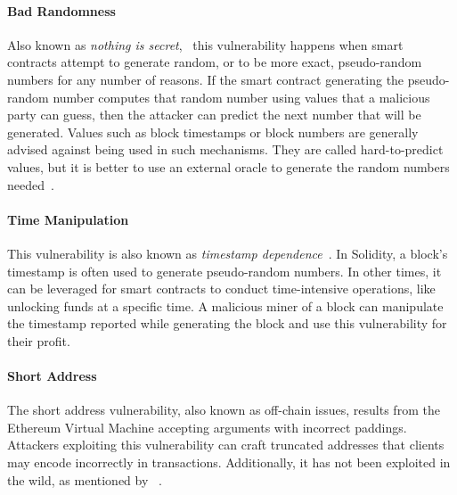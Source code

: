             \paragraph{Bad Randomness}
            Also known as \textit{nothing is secret},~\cite{dasp} this vulnerability happens when smart contracts attempt to generate random, or to be more exact, pseudo-random numbers for any number of reasons.
            If the smart contract generating the pseudo-random number computes that random number using values that a malicious party can guess, then the attacker can predict the next number that will be generated.
            Values such as block timestamps or block numbers are generally advised against being used in such mechanisms. They are called hard-to-predict values, but it is better to use an external oracle to generate the random numbers needed~\cite{swcregistry}.
        
            \paragraph{Time Manipulation}
            This vulnerability is also known as \textit{timestamp dependence}~\cite{dasp}.
            In Solidity, a block's timestamp is often used to generate pseudo-random numbers. In other times, it can be leveraged for smart contracts to conduct time-intensive operations, like unlocking funds at a specific time.
            A malicious miner of a block can manipulate the timestamp reported while generating the block and use this vulnerability for their profit. 
        
            \paragraph{Short Address}
            The short address vulnerability, also known as off-chain issues, results from the Ethereum Virtual Machine accepting arguments with incorrect paddings.
            Attackers exploiting this vulnerability can craft truncated addresses that clients may encode incorrectly in transactions.
            Additionally, it has not been exploited in the wild, as mentioned by ~\cite{ferreira2020smartbugs}.